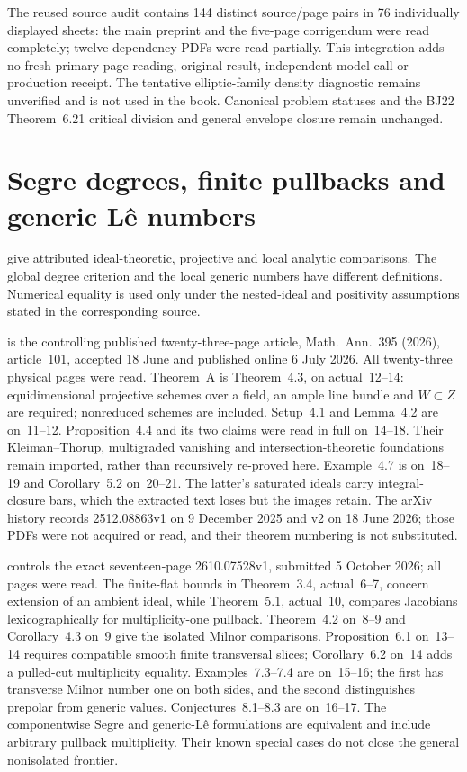 The reused source audit contains 144 distinct source/page pairs
in 76 individually displayed sheets: the main preprint and the
five-page corrigendum were read completely; twelve dependency
PDFs were read partially. This integration adds no fresh primary
page reading, original result, independent model call or production
receipt. The tentative elliptic-family density diagnostic remains
unverified and is not used in the book. Canonical problem statuses
and the BJ22 Theorem~6.21 critical division and general envelope
closure remain unchanged.

\section{Segre degrees, finite pullbacks and generic L\^e numbers}
\label{sec:appL-Segre-source-gates}

give attributed ideal-theoretic, projective and local analytic
comparisons. The global degree criterion and the local generic
numbers have different definitions. Numerical equality is used
only under the nested-ideal and positivity assumptions stated
in the corresponding source.

\cite{CidRuiz26SegrePublished} is the controlling published
twenty-three-page article, Math.~Ann.~395 (2026), article~101,
accepted 18 June and published online 6 July 2026.
All twenty-three physical pages were read. Theorem~A is
Theorem~4.3, on actual~12--14: equidimensional projective schemes
over a field, an ample line bundle and $W\subset Z$ are
required; nonreduced schemes are included. Setup~4.1 and
Lemma~4.2 are on~11--12. Proposition~4.4 and its two claims
were read in full on~14--18. Their Kleiman--Thorup,
multigraded vanishing and intersection-theoretic foundations
remain imported, rather than recursively re-proved here.
Example~4.7 is on~18--19 and Corollary~5.2 on~20--21.
The latter's saturated ideals carry integral-closure bars,
which the extracted text loses but the images retain.
The arXiv history records 2512.08863v1 on 9 December 2025
and v2 on 18 June 2026; those PDFs were not acquired or
read, and their theorem numbering is not substituted.

\cite{JelonekPerezSantos26SegreV1} controls the exact
seventeen-page 2610.07528v1, submitted 5 October 2026;
all pages were read. The finite-flat bounds in Theorem~3.4,
actual~6--7, concern extension of an ambient ideal, while
Theorem~5.1, actual~10, compares Jacobians lexicographically
for multiplicity-one pullback. Theorem~4.2 on~8--9 and
Corollary~4.3 on~9 give the isolated Milnor comparisons.
Proposition~6.1 on~13--14 requires compatible smooth finite
transversal slices; Corollary~6.2 on~14 adds a pulled-cut
multiplicity equality. Examples~7.3--7.4 are on~15--16;
the first has transverse Milnor number one on both sides,
and the second distinguishes prepolar from generic values.
Conjectures~8.1--8.3 are on~16--17. The componentwise Segre
and generic-L\^e formulations are equivalent and include
arbitrary pullback multiplicity. Their known special cases
do not close the general nonisolated frontier.

